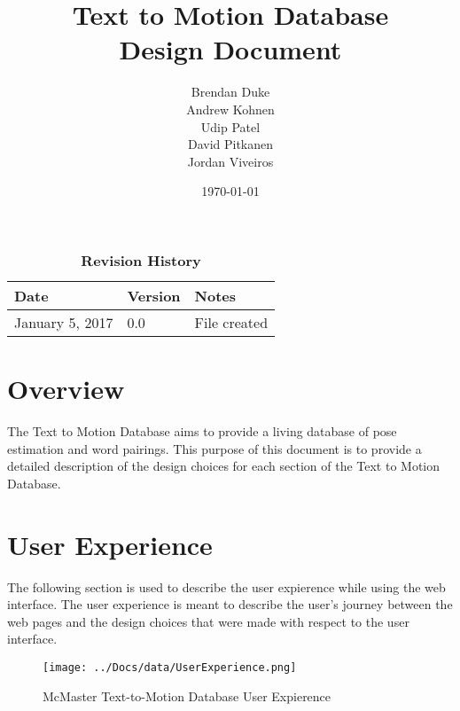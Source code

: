 \documentclass{scrreprt}
\begin{document}
\title{\bf Text to Motion Database\\[\baselineskip]\Large Design Document}
\author{Brendan Duke\\Andrew Kohnen\\Udip Patel\\David Pitkanen\\Jordan Viveiros}
\date{\today}

\maketitle

\tableofcontents


\begin{table}[bp]
\caption*{\bf Revision History}
\begin{tabularx}{\textwidth}{p{3.5cm}p{2cm}X}
\toprule {\bf Date} & {\bf Version} & {\bf Notes}\\
\midrule
January 5, 2017 & 0.0 & File created\\
\bottomrule
\end{tabularx}
\end{table}

\newpage


\chapter{Overview}
The Text to Motion Database aims to provide a living database of pose estimation and word pairings. This purpose of this document is to provide a detailed description of the design choices for each section of the Text to Motion Database.

\chapter{User Experience}
The following section is used to describe the user expierence while using the web interface. The user experience is meant to describe the user's journey between the web pages and the design choices that were made with respect to the user interface.

\begin{figure}[!ht]
        \caption{McMaster Text-to-Motion Database User Expierence}
        \label{userExp}
        \centering
        \texttt{[image: ../Docs/data/UserExperience.png]}
\end{figure}
\end{document}
